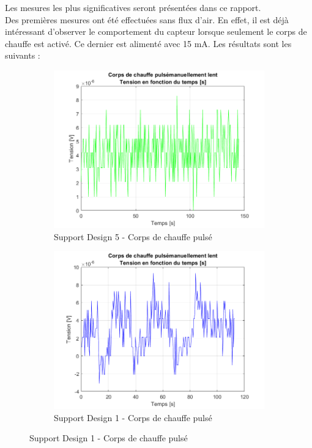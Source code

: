 Les mesures les plus significatives seront présentées dans ce rapport. \\

Des premières mesures ont été effectuées sans flux d'air. En effet, il est déjà intéressant d'observer le comportement du capteur
lorsque seulement le corps de chauffe est activé. Ce dernier est alimenté avec 15 mA. Les résultats sont les suivants :
\begin{figure}[H]
    \hspace{-0.5cm}
    \begin{subfigure}[b]{0.45\textwidth}
        \includegraphics[scale = 0.45]{assets/figures/corps_chauffe_pulse_green.png}
        \caption{Support Design 5 - Corps de chauffe pulsé}
        \label{fig:chauffe_pulse_g}
    \end{subfigure}
    \begin{subfigure}[b]{0.45\textwidth}
        \includegraphics[scale = 0.45]{assets/figures/corps_chauffe_pulse_blue.png}
        \caption{Support Design 1 - Corps de chauffe pulsé}
        \label{fig:chauffe_pulse_b}
    \end{subfigure}
\end{figure}

